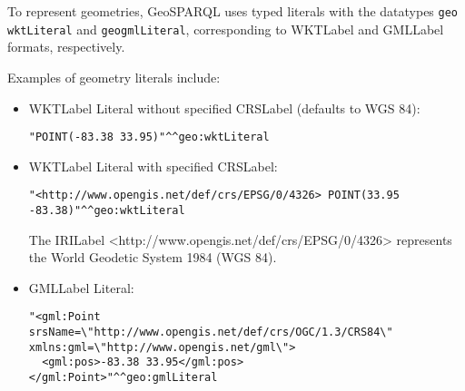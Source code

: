 


To represent geometries, GeoSPARQL uses typed literals with the datatypes \texttt{\gls{geo}} \texttt{wktLiteral} and \texttt{\gls{geo}gmlLiteral}, corresponding to \acrfull{WKTLabel}\cite{WellknownTextRepresentationa} and \acrfull{GMLLabel}\cite{GeographyMarkupLanguagea} formats, respectively.

Examples of geometry literals include:

\begin{itemize}
   
 \item  \acrshort{WKTLabel} Literal without specified \acrshort{CRSLabel} (defaults to WGS 84):

\begin{lstlisting}[caption=WKT literal without CRS, label={lst:wktLiteral}]
    "POINT(-83.38 33.95)"^^geo:wktLiteral
\end{lstlisting}


 \item  \acrshort{WKTLabel} Literal with specified \acrshort{CRSLabel}:

\begin{lstlisting}[caption=WKT literal with CRS specified, label={lst:wktLiteralCRS}]
    "<http://www.opengis.net/def/crs/EPSG/0/4326> POINT(33.95 -83.38)"^^geo:wktLiteral
\end{lstlisting}

The \acrshort{IRILabel} <http://www.opengis.net/def/crs/EPSG/0/4326> represents the World Geodetic System 1984 (WGS 84).

 \item  \acrshort{GMLLabel} Literal:

\begin{lstlisting}[caption=GML literal, label={lst:GMLLiteral}]
"<gml:Point srsName=\"http://www.opengis.net/def/crs/OGC/1.3/CRS84\" xmlns:gml=\"http://www.opengis.net/gml\">
  <gml:pos>-83.38 33.95</gml:pos>
</gml:Point>"^^geo:gmlLiteral
\end{lstlisting}

\end{itemize}

